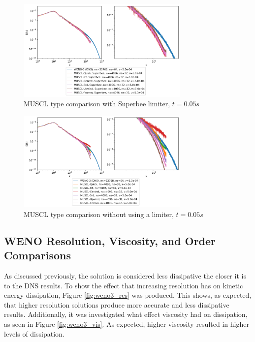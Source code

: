 \documentclass[conf]{new-aiaa}
\begin{document}
\begin{figure}[hbt!]
	\centering
	\includegraphics[width=0.75\textwidth]{figures/MUSCL_Superbee_Type_Comparison_Ek_vs_k.png}
	\caption{MUSCL type comparison with Superbee limiter, $t=0.05s$}
	\label{fig:muscl_sb_type}
\end{figure}

\begin{figure}[hbt!]
	\centering
	\includegraphics[width=0.75\textwidth]{figures/MUSCL_Type_Comparison_Ek_vs_k.png}
	\caption{MUSCL type comparison without using a limiter, $t=0.05s$}
	\label{fig:muscl_type}
\end{figure}

\subsection{WENO Resolution, Viscosity, and Order Comparisons}

As discussed previously, the solution is considered less dissipative the closer
it is to the DNS results. To show the effect that increasing resolution has on
kinetic energy dissipation, Figure \ref{fig:weno3_res} was produced. This
shows, as expected, that higher resolution solutions produce more accurate and
less dissipative results. Additionally, it was investigated what effect
viscosity had on dissipation, as seen in Figure \ref{fig:weno3_vis}. As
expected, higher viscosity resulted in higher levels of dissipation.
\end{document}
